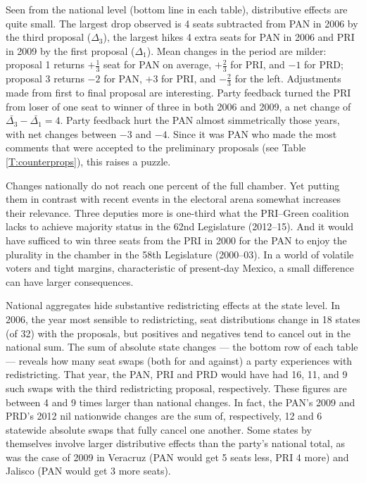 \documentclass[letter,12pt]{article}
\begin{document}
Seen from the national level (bottom line in each table), distributive effects are quite small. The largest drop observed is 4 seats subtracted from PAN in 2006 by the third proposal ($\Delta_3$), the largest hikes 4 extra seats for PAN in 2006 and PRI in 2009 by the first proposal ($\Delta_1$). Mean changes in the period are milder: proposal 1 returns $+\frac{1}{3}$ seat for PAN on average, $+\frac{2}{3}$ for PRI, and $-1$ for PRD; proposal 3 returns $-2$ for PAN, $+3$ for PRI, and $-\frac{2}{3}$ for the left. Adjustments made from first to final proposal are interesting. Party feedback turned the PRI from loser of one seat to winner of three in both 2006 and 2009, a net change of $\bar{\Delta_3} - \bar{\Delta_1} = 4$. Party feedback hurt the PAN almost simmetrically those years, with net changes between $-3$ and $-4$. Since it was PAN who made the most comments that were accepted to the preliminary proposals (see Table \ref{T:counterprops}), this raises a puzzle. 

Changes nationally do not reach one percent of the full chamber. Yet putting them in contrast with recent events in the electoral arena somewhat increases their relevance. Three deputies more is one-third what the PRI--Green coalition lacks to achieve majority status in the 62nd Legislature (2012--15). And it would have sufficed to win three seats from the PRI in 2000 for the PAN to enjoy the plurality in the chamber in the 58th Legislature (2000--03). In a world of volatile voters and tight margins, characteristic of present-day Mexico, a small difference can have larger consequences. 


National aggregates hide substantive redistricting effects at the state level. In 2006, the year most sensible to redistricting, seat distributions change in 18 states (of 32) with the proposals, but positives and negatives tend to cancel out in the national sum. The sum of absolute state changes --- the bottom row of each table --- reveals how many seat swaps (both for and against) a party experiences with redistricting. That year, the PAN, PRI and PRD would have had 16, 11, and 9 such swaps with the third redistricting proposal, respectively. These figures are between 4 and 9 times larger than national changes. In fact, the PAN's 2009 and PRD's 2012 nil nationwide changes are the sum of, respectively, 12 and 6 statewide absolute swaps that fully cancel one another. Some states by themselves involve larger distributive effects than the party's national total, as was the case of 2009 in Veracruz (PAN would get 5 seats less, PRI 4 more) and Jalisco (PAN would get 3 more seats). 
\end{document}

